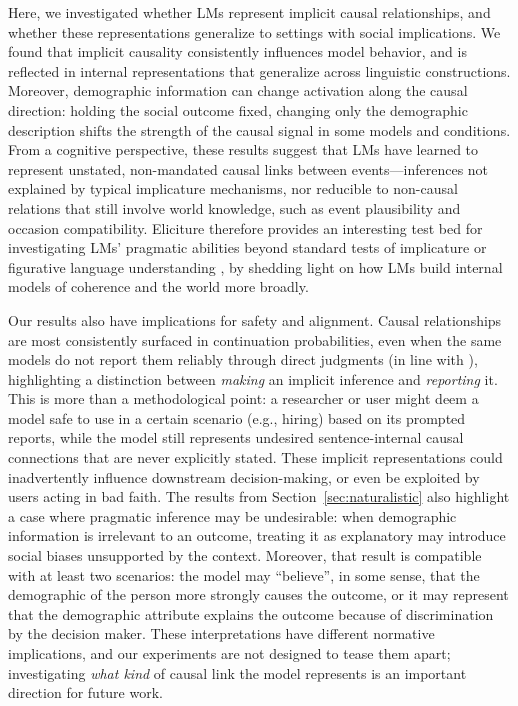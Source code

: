 \documentclass{article}
\begin{document}
Here, we investigated whether LMs represent implicit causal relationships, and whether these representations generalize to settings with social implications. We found that implicit causality consistently influences model behavior, and is reflected in internal representations that generalize across linguistic constructions. Moreover, demographic information can change activation along the causal direction: holding the social outcome fixed, changing only the demographic description shifts the strength of the causal signal in some models and conditions. From a cognitive perspective, these results suggest that LMs have learned to represent unstated, non-mandated causal links between events---inferences not explained by typical implicature mechanisms, nor reducible to non-causal relations that still involve world knowledge, such as event plausibility and occasion compatibility. Eliciture therefore provides an interesting test bed for investigating LMs' pragmatic abilities beyond standard tests of implicature or figurative language understanding \citep{pan-kehler-2025-pragmatic}, by shedding light on how LMs build internal models of coherence and the world more broadly.

Our results also have implications for safety and alignment. Causal relationships are most consistently surfaced in continuation probabilities, even when the same models do not report them reliably through direct judgments (in line with \citealt{hu-levy-2023-prompting}), highlighting a distinction between \emph{making} an implicit inference and \emph{reporting} it. This is more than a methodological point: a researcher or user might deem a model safe to use in a certain scenario (e.g., hiring) based on its prompted reports, while the model still represents undesired sentence-internal causal connections that are never explicitly stated. These implicit representations could inadvertently influence downstream decision-making, or even be exploited by users acting in bad faith. The results from Section~\ref{sec:naturalistic} also highlight a case where pragmatic inference may be undesirable: when demographic information is irrelevant to an outcome, treating it as explanatory may introduce social biases unsupported by the context. Moreover, that result is compatible with at least two scenarios: the model may ``believe'', in some sense, that the demographic of the person more strongly causes the outcome, or it may represent that the demographic attribute explains the outcome because of discrimination by the decision maker. These interpretations have different normative implications, and our experiments are not designed to tease them apart; investigating \emph{what kind} of causal link the model represents is an important direction for future work.
\end{document}
